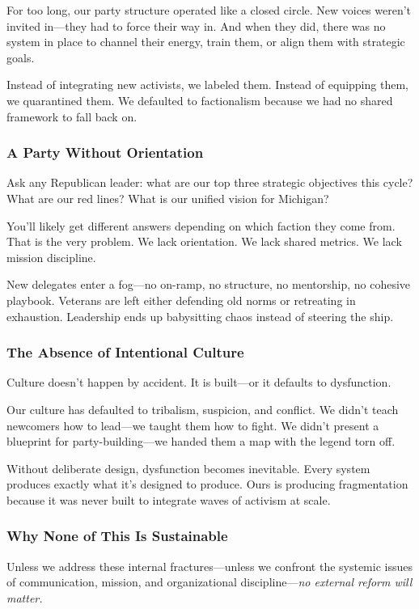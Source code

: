For too long, our party structure operated like a closed circle. New voices weren’t invited in—they had to force their way in. And when they did, there was no system in place to channel their energy, train them, or align them with strategic goals.

Instead of integrating new activists, we labeled them. Instead of equipping them, we quarantined them. We defaulted to factionalism because we had no shared framework to fall back on.

\subsubsection{A Party Without Orientation}
Ask any Republican leader: what are our top three strategic objectives this cycle? What are our red lines? What is our unified vision for Michigan?

You’ll likely get different answers depending on which faction they come from. That is the very problem. We lack orientation. We lack shared metrics. We lack mission discipline.

New delegates enter a fog—no on-ramp, no structure, no mentorship, no cohesive playbook. Veterans are left either defending old norms or retreating in exhaustion. Leadership ends up babysitting chaos instead of steering the ship.

\subsubsection{The Absence of Intentional Culture}
Culture doesn’t happen by accident. It is built—or it defaults to dysfunction.

Our culture has defaulted to tribalism, suspicion, and conflict. We didn’t teach newcomers how to lead—we taught them how to fight. We didn’t present a blueprint for party-building—we handed them a map with the legend torn off.

Without deliberate design, dysfunction becomes inevitable. Every system produces exactly what it’s designed to produce. Ours is producing fragmentation because it was never built to integrate waves of activism at scale.

\subsubsection{Why None of This Is Sustainable}
Unless we address these internal fractures—unless we confront the systemic issues of communication, mission, and organizational discipline—\textit{no external reform will matter.}

